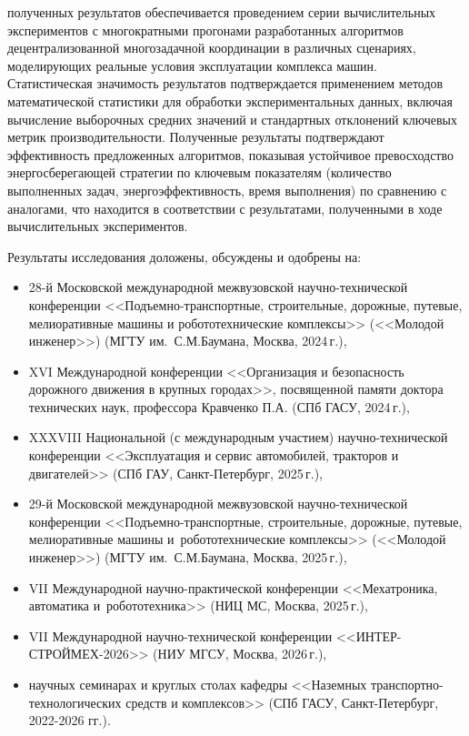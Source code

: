 {\reliability} полученных результатов обеспечивается проведением серии вычислительных экспериментов с многократными прогонами разработанных алгоритмов децентрализованной многозадачной координации в различных сценариях, моделирующих реальные условия эксплуатации комплекса машин. Статистическая значимость результатов подтверждается применением методов математической статистики для обработки экспериментальных данных, включая вычисление выборочных средних значений и стандартных отклонений ключевых метрик производительности. Полученные результаты подтверждают эффективность предложенных алгоритмов, показывая устойчивое превосходство энергосберегающей стратегии по ключевым показателям (количество выполненных задач, энергоэффективность, время выполнения) по сравнению с аналогами, что находится в соответствии с результатами, полученными в ходе вычислительных экспериментов.

{\probation}
Результаты исследования доложены, обсуждены и одобрены на:

\begin{itemize}[beginpenalty=10000, midpenalty=10000, wide=\parindent, leftmargin=0pt]
	\item 28-й Московской международной межвузовской научно-технической конференции <<Подъемно-транспортные, строительные, дорожные, путевые, мелиоративные машины и робототехнические комплексы>> (<<Молодой инженер>>) (МГТУ им.~С.М.Баумана, Москва, 2024\,г.),
	\item XVI Международной конференции <<Организация и безопасность дорожного движения в крупных городах>>, посвященной памяти доктора технических наук, профессора Кравченко П.А. (СПб ГАСУ, 2024\,г.),
	\item XXXVIII Национальной (с международным участием) научно-технической конференции <<Эксплуатация и сервис автомобилей, тракторов и двигателей>> (СПб ГАУ, Санкт-Петербург, 2025\,г.),
	\item 29-й Московской международной межвузовской научно-технической конференции <<Подъемно-транспортные, строительные, дорожные, путевые, мелиоративные машины и~робототехнические комплексы>> (<<Молодой инженер>>) (МГТУ им.~С.М.Баумана, Москва, 2025\,г.),
	\item VII Международной научно-практической конференции <<Мехатроника, автоматика и~робототехника>> (НИЦ МС, Москва, 2025\,г.),
    \item VII Международной научно-технической конференции <<ИНТЕР-СТРОЙМЕХ-2026>> (НИУ МГСУ, Москва, 2026\,г.),
	\item научных семинарах и круглых столах кафедры <<Наземных транспортно-технологических средств и комплексов>> (СПб ГАСУ, Санкт-Петербург, 2022-2026 гг.).
\end{itemize}

